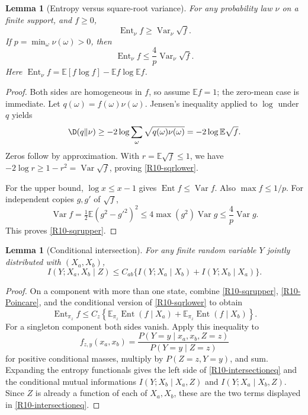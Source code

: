 \documentclass[11pt,a4paper]{article}
\newtheorem{lemma}[theorem]{Lemma}
\theoremstyle{definition}\newtheorem{definition}[theorem]{Definition}
\theoremstyle{remark}\newtheorem{remark}[theorem]{Remark}
\newcommand{\E}{\mathbb E}\newcommand{\one}{\mathbf 1}\newcommand{\1}{\mathbf 1}
\numberwithin{equation}{section}
\begin{document}
\begin{lemma}[Entropy versus square-root variance]\label{R10-sqrt}
For any probability law $\nu$ on a finite support, and $f\ge0$,
\begin{equation}\label{R10-sqrlower}
 \operatorname{Ent}_\nu f\ge\operatorname{Var}_\nu\sqrt f.
\end{equation}
If $p=\min_\omega\nu(\omega)>0$, then
\begin{equation}\label{R10-sqrupper}
 \operatorname{Ent}_\nu f\le\frac4p\operatorname{Var}_\nu\sqrt f.
\end{equation}
Here $\operatorname{Ent}_\nu f=\E[f\log f]-\E f\log\E f$.
\end{lemma}
\begin{proof}
Both sides are homogeneous in $f$, so assume $\E f=1$; the zero-mean case is immediate. Let $q(\omega)=f(\omega)\nu(\omega)$. Jensen's inequality applied to $\log$ under $q$ yields
\[
 \D(q\Vert\nu)\ge-2\log\sum_\omega\sqrt{q(\omega)\nu(\omega)}
 =-2\log\E\sqrt f.
\]
Zeros follow by approximation. With $r=\E\sqrt f\le1$, we have $-2\log r\ge1-r^2=\operatorname{Var}\sqrt f$, proving \eqref{R10-sqrlower}.

For the upper bound, $\log x\le x-1$ gives $\operatorname{Ent}f\le\operatorname{Var}f$. Also $\max f\le1/p$. For independent copies $g,g'$ of $\sqrt f$,
\[
 \operatorname{Var}f=\tfrac12\E(g^2-g'^2)^2
 \le4\max(g^2)\operatorname{Var}g
 \le\frac4p\operatorname{Var}g.
\]
This proves \eqref{R10-sqrupper}.
\end{proof}

\begin{lemma}[Conditional intersection]\label{R10-intersection}
For any finite random variable $Y$ jointly distributed with $(X_a,X_b)$,
\begin{equation}\label{R10-intersectioneq}
 I(Y;X_a,X_b\mid Z)
 \le C_{ab}\{I(Y;X_a\mid X_b)+I(Y;X_b\mid X_a)\}.
\end{equation}
\end{lemma}
\begin{proof}
On a component with more than one state, combine \eqref{R10-sqrupper}, \eqref{R10-Poincare}, and the conditional version of \eqref{R10-sqrlower} to obtain
\[
 \operatorname{Ent}_{\pi_z}f\le C_z\left\{
 \E_{\pi_z}\operatorname{Ent}(f\mid X_a)+
 \E_{\pi_z}\operatorname{Ent}(f\mid X_b)\right\}.
\]
For a singleton component both sides vanish. Apply this inequality to
\[
 f_{z,y}(x_a,x_b)=
 \frac{P(Y=y\mid x_a,x_b,Z=z)}{P(Y=y\mid Z=z)}
\]
for positive conditional masses, multiply by $P(Z=z,Y=y)$, and sum. Expanding the entropy functionals gives the left side of \eqref{R10-intersectioneq} and the conditional mutual informations $I(Y;X_b\mid X_a,Z)$ and $I(Y;X_a\mid X_b,Z)$. Since $Z$ is already a function of each of $X_a,X_b$, these are the two terms displayed in \eqref{R10-intersectioneq}.
\end{proof}
\end{document}
